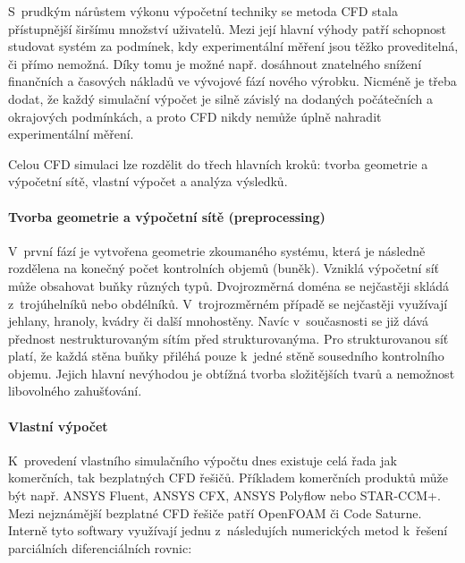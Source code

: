S~prudkým nárůstem výkonu výpočetní techniky se metoda CFD stala přístupnější širšímu množství uživatelů. Mezi její hlavní výhody patří schopnost studovat systém za podmínek, kdy experimentální měření jsou těžko proveditelná, či přímo nemožná. Díky tomu je možné např. dosáhnout znatelného snížení finančních a časových nákladů ve vývojové fází nového výrobku. Nicméně je třeba dodat, že každý simulační výpočet je silně závislý na dodaných počátečních a okrajových podmínkách, a proto CFD nikdy nemůže úplně nahradit experimentální měření.

Celou CFD simulaci lze rozdělit do třech hlavních kroků: tvorba geometrie a výpočetní sítě, vlastní výpočet a analýza výsledků.

\paragraph{Tvorba geometrie a výpočetní sítě (preprocessing)}
V~první fází je vytvořena geometrie zkoumaného systému, která je následně rozdělena na konečný počet kontrolních objemů (buněk). Vzniklá výpočetní síť může obsahovat buňky různých typů. Dvojrozměrná doména se nejčastěji skládá z~trojúhelníků nebo obdélníků. V~trojrozměrném případě se nejčastěji využívají jehlany, hranoly, kvádry či další mnohostěny. Navíc v~současnosti se již dává přednost nestrukturovaným sítím před strukturovanýma. Pro strukturovanou síť platí, že každá stěna buňky přiléhá pouze k~jedné stěně sousedního kontrolního objemu. Jejich hlavní nevýhodou je obtížná tvorba složitějších tvarů a nemožnost libovolného zahušťování.

\paragraph{Vlastní výpočet}
K~provedení vlastního simulačního výpočtu dnes existuje celá řada jak komerčních, tak bezplatných CFD řešičů. Příkladem komerčních produktů může být např. ANSYS Fluent, ANSYS CFX,  ANSYS Polyflow nebo STAR-CCM+. Mezi nejznámější bezplatné CFD řešiče patří OpenFOAM či Code Saturne. Interně tyto softwary využívají jednu z~následujích numerických metod k~řešení parciálních diferenciálních rovnic:

